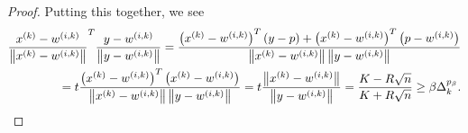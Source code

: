\begin{proof}
Putting this together, we see
\begin{align*}
\frac{x^{(k)} - {w^{(i, k)}}}{\left\|x^{(k)} - {w^{(i, k)}}\right\|}^T\frac{y - {w^{(i, k)}}}{\left\|y - {w^{(i, k)}}\right\|} 
= \frac{\left(x^{(k)} - {w^{(i, k)}}\right) ^T\left(y - p\right) + \left(x^{(k)} - {w^{(i, k)}}\right)^T\left(p - {w^{(i, k)}}\right)}{\left\|x^{(k)} - {w^{(i, k)}}\right\|\left\|y - {w^{(i, k)}}\right\|} \\
= t\frac{\left(x^{(k)} - {w^{(i, k)}}\right)^T\left(x^{(k)} - {w^{(i, k)}}\right)}{\left\|x^{(k)} - {w^{(i, k)}}\right\|\left\|y - {w^{(i, k)}}\right\|}
= t \frac{\left\|x^{(k)} - {w^{(i, k)}}\right\|}{\left\|y - {w^{(i, k)}}\right\|}
= \frac {K - R\sqrt{n}}{K + R\sqrt{n}} \ge \beta \Delta_k^{p_{\beta}}.
\end{align*}
\end{proof}


